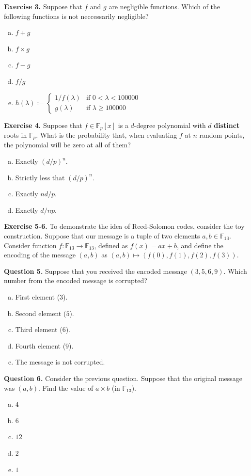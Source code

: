 \documentclass[../lecture-notes.tex]{subfiles}
\begin{document}
\textbf{Exercise 3.} Suppose that $f$ and $g$ are negligible functions. Which of the following functions is not neccessarily negligible?
\begin{enumerate}[a)]
    \item $f + g$
    \item $f \times g$
    \item $f - g$
    \item $f/g$
    \item $h(\lambda) := \begin{cases}
        1/f(\lambda) & \text{if } 0 < \lambda < 100000 \\
        g(\lambda) & \text{if } \lambda \geq 100000
    \end{cases}$
\end{enumerate}

\textbf{Exercise 4.} Suppose that $f \in \mathbb{F}_p[x]$ is a $d$-degree polynomial with $d$ \textbf{distinct} roots in $\mathbb{F}_p$. What is the probability that, when evaluating $f$ at $n$ random points, the polynomial will be zero at all of them?

\begin{enumerate}[a)]
    \item Exactly $(d/p)^n$.
    \item Strictly less that $(d/p)^n$.
    \item Exactly $nd/p$.
    \item Exactly $d/np$.
\end{enumerate}

\textbf{Exercise 5-6.} To demonstrate the idea of Reed-Solomon codes, consider the toy construction. Suppose that our message is a tuple of two elements $a,b \in \mathbb{F}_{13}$. Consider function $f: \mathbb{F}_{13} \to \mathbb{F}_{13}$, defined as $f(x) = ax+b$, and define the encoding of the message $(a,b)$ as $(a,b) \mapsto (f(0),f(1),f(2),f(3))$. 

\textbf{Question 5.} Suppose that you received the encoded message $(3,5,6,9)$. Which number from the encoded message is corrupted?
\begin{enumerate}[a)]
    \item First element ($3$).
    \item Second element ($5$).
    \item Third element ($6$).
    \item Fourth element ($9$).
    \item The message is not corrupted.
\end{enumerate}

\textbf{Question 6.} Consider the previous question. Suppose that the original message was $(a,b)$. Find the value of $a \times b$ (in $\mathbb{F}_{13}$).
\begin{enumerate}[a)]
    \item $4$
    \item $6$
    \item $12$
    \item $2$
    \item $1$
\end{enumerate}
\end{document}
